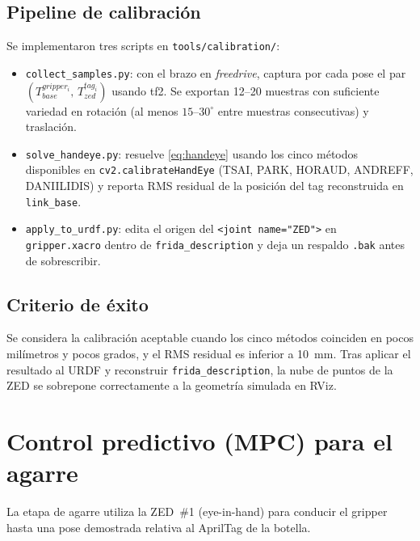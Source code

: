 \documentclass[conference]{IEEEtran}
\begin{document}
\subsection{Pipeline de calibraci\'on}

Se implementaron tres scripts en
\texttt{tools/calibration/}:

\begin{itemize}
  \item \texttt{collect\_samples.py}: con el brazo en \emph{freedrive},
        captura por cada pose el par
        $(T_{base}^{gripper_i},\, T_{zed}^{tag_i})$ usando tf2.
        Se exportan 12--20 muestras con suficiente variedad en
        rotaci\'on (al menos $15$--$30^\circ$ entre muestras
        consecutivas) y traslaci\'on.
  \item \texttt{solve\_handeye.py}: resuelve
        \eqref{eq:handeye} usando los cinco m\'etodos disponibles en
        \texttt{cv2.calibrateHandEye} (TSAI, PARK, HORAUD, ANDREFF,
        DANIILIDIS) y reporta RMS residual de la posici\'on del tag
        reconstruida en \texttt{link\_base}.
  \item \texttt{apply\_to\_urdf.py}: edita el origen del
        \texttt{<joint name="ZED">} en \texttt{gripper.xacro} dentro
        de \texttt{frida\_description} y deja un respaldo
        \texttt{.bak} antes de sobrescribir.
\end{itemize}

\subsection{Criterio de \'exito}

Se considera la calibraci\'on aceptable cuando los cinco m\'etodos
coinciden en pocos mil\'imetros y pocos grados, y el RMS residual es
inferior a \SI{10}{\milli\meter}. Tras aplicar el resultado al URDF
y reconstruir \texttt{frida\_description}, la nube de puntos de la
ZED se sobrepone correctamente a la geometr\'ia simulada en RViz.

\section{Control predictivo (MPC) para el agarre}

La etapa de agarre utiliza la ZED~\#1 (eye-in-hand) para conducir el
gripper hasta una pose demostrada relativa al AprilTag de la botella.
\end{document}

